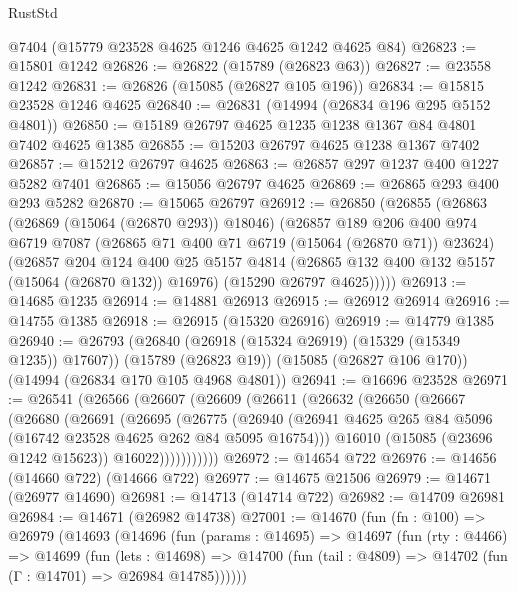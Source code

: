 \begin{lexlean}{RustStd}
\begin{coremodule}
    @7404
    (@15779 @23528 @4625 @1246 @4625 @1242 @4625 @84)
@26823 := @15801 @1242
@26826 := @26822 (@15789 (@26823 @63))
@26827 := @23558 @1242
@26831 := @26826 (@15085 (@26827 @105 @196))
@26834 := @15815 @23528 @1246 @4625
@26840 := @26831 (@14994 (@26834 @196 @295 @5152 @4801))
@26850 := @15189 @26797 @4625 @1235 @1238 @1367 @84 @4801 @7402 @4625 @1385
@26855 := @15203 @26797 @4625 @1238 @1367 @7402
@26857 := @15212 @26797 @4625
@26863 := @26857 @297 @1237 @400 @1227 @5282 @7401
@26865 := @15056 @26797 @4625
@26869 := @26865 @293 @400 @293 @5282
@26870 := @15065 @26797
@26912 := @26850
    (@26855
      (@26863
        (@26869 (@15064 (@26870 @293)) @18046)
        (@26857
          @189
          @206
          @400
          @974
          @6719
          @7087
          (@26865 @71 @400 @71 @6719 (@15064 (@26870 @71)) @23624)
          (@26857
            @204
            @124
            @400
            @25
            @5157
            @4814
            (@26865 @132 @400 @132 @5157 (@15064 (@26870 @132)) @16976)
            (@15290 @26797 @4625)))))
@26913 := @14685 @1235
@26914 := @14881 @26913
@26915 := @26912 @26914
@26916 := @14755 @1385
@26918 := @26915 (@15320 @26916)
@26919 := @14779 @1385
@26940 := @26793
    (@26840 (@26918 (@15324 @26919) (@15329 (@15349 @1235)) @17607))
    (@15789 (@26823 @19))
    (@15085 (@26827 @106 @170))
    (@14994 (@26834 @170 @105 @4968 @4801))
@26941 := @16696 @23528
@26971 := @26541
    (@26566
      (@26607
        (@26609
          (@26611
            (@26632
              (@26650
                (@26667
                  (@26680
                    (@26691
                      (@26695
                        (@26775
                          (@26940
                            (@26941
                              @4625
                              @265
                              @84
                              @5096
                              (@16742 @23528 @4625 @262 @84 @5095 @16754)))
                          @16010
                          (@15085 (@23696 @1242 @15623))
                          @16022)))))))))))
@26972 := @14654 @722
@26976 := @14656 (@14660 @722) (@14666 @722)
@26977 := @14675 @21506
@26979 := @14671 (@26977 @14690)
@26981 := @14713 (@14714 @722)
@26982 := @14709 @26981
@26984 := @14671 (@26982 @14738)
@27001 := @14670
    (fun (fn : @100) =>
    @26979
      (@14693
        (@14696
          (fun (params : @14695) =>
          @14697
            (fun (rty : @4466) =>
            @14699
              (fun (lets : @14698) =>
              @14700 (fun (tail : @4809) => @14702 (fun (Γ : @14701) => @26984 @14785))))))

\end{coremodule}
\end{lexlean}

